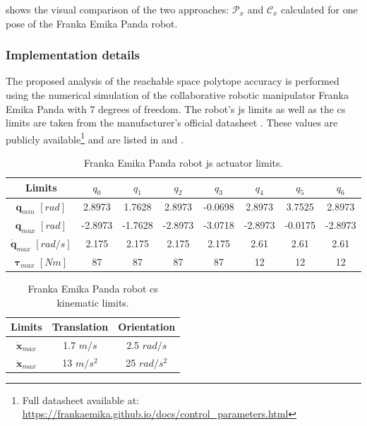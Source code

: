 shows the visual comparison of the two approaches: $\mathcal{P}_x$ and $\mathcal{C}_x$ calculated for one pose of the {Franka Emika Panda} robot. 

\subsubsection{Implementation details}

The proposed analysis of the reachable space polytope accuracy is performed using the numerical simulation of the collaborative robotic manipulator {Franka Emika Panda} with 7 degrees of freedom. The robot's \gls{js} limits as well as the \gls{cs} limits are taken from the manufacturer's official datasheet \cite{franka_maual}. These values are publicly available\footnote{\label{note:franka}Full datasheet available at: \url{https://frankaemika.github.io/docs/control_parameters.html}} and are listed in  and .

\begin{table}[h!]
    \centering
    \begin{tabular}{|c|ccccccc|}
        \hline
        Limits & $q_0$ & $q_1$ & $q_2$ & $q_3$ & $q_4$ & $q_5$ & $q_6$ \\
        \hline
        ${\bm{q}}_{min}$ $[{rad}]$ & 2.8973 & 1.7628 & 2.8973 & -0.0698 & 2.8973 & 3.7525 & 2.8973\\
        ${\bm{q}}_{max}$ $[{rad}]$ & -2.8973 & -1.7628 & -2.8973 & -3.0718 & -2.8973 & -0.0175 & -2.8973\\
        $\dot{\bm{q}}_{max}$ $[{rad}/{s}]$ & 2.175 & 2.175 & 2.175 & 2.175 & 2.61 & 2.61 & 2.61 \\
        $\bm{\tau}_{max}$  $[Nm]$ & 87 & 87 & 87 & 87 & 12 & 12 & 12 \\
        \hline
    \end{tabular}
    \caption{Franka Emika Panda robot \gls{js} actuator limits.}
    \label{tab:panda_limits_js_hfr}
\end{table}

	
\begin{table}[h]
    \centering
    \begin{tabular}{|c|cc|}
        \hline
        Limits & Translation & Orientation \\
        \hline
        $\dot{\bm{x}}_{max}$ & 1.7 $m/s$ & 2.5 $rad/s$ \\
        $\ddot{\bm{x}}_{max}$ & 13 $m/s^2$ & 25 $rad/s^{2}$\\
        \hline
    \end{tabular}
    \caption{Franka Emika Panda robot \gls{cs} kinematic limits.}
    \label{table:franka_limits_cs_hfr}
\end{table}



